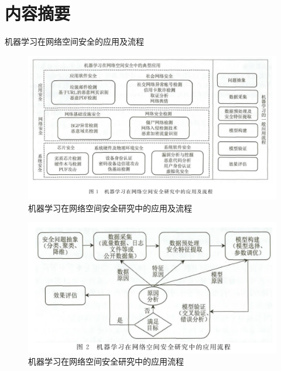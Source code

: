 \documentclass[UTF8]{ctexart}
\begin{document}
	\section{内容摘要}\label{sec:disnajie}
	机器学习在网络空间安全的应用及流程
	\begin{figure}[ht]
        \centering
        \includegraphics[scale=0.5]{picture/001.png}
        \caption{机器学习在网络空间安全研究中的应用及流程}
        \label{fig:001}
    \end{figure}
  	\begin{figure}[ht]
        \centering
        \includegraphics[scale=0.5]{picture/002.png}
        \caption{机器学习在网络空间安全研究中的应用流程}
        \label{fig:002}
    \end{figure}
\end{document}
